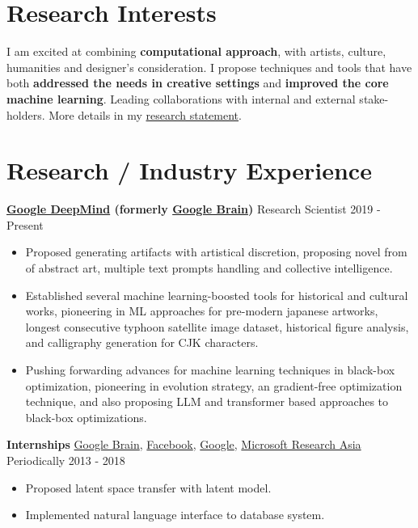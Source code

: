 \documentclass[line,margin]{cv}
\makeatletter
\newcommand{\Google}{\href{https://www.google.com/}{Google}}
\newcommand{\GoogleBrain}{\href{http://research.google.com/teams/brain/}{Google Brain}}
\newcommand{\GoogleDeepMind}{\href{https://www.deepmind.com/}{Google DeepMind}}
\newcommand{\Facebook}{\href{https://www.facebook.com/}{Facebook}}
\newcommand{\MyWebsite}{\href{https://alantian.net}{alantian.net}}
\newcommand{\MyMail}{\href{mailto:alan.yt.tian@gmail.com}{\nolinkurl{alan.yt.tian@gmail.com}}}
\newcommand{\MSRA}{\href{http://research.microsoft.com/en-us/labs/asia/default.aspx}{Microsoft Research Asia}}
\makeatother
\begin{document}

\address{Research Scientist \textbullet{} \GoogleDeepMind{}  / \MyMail{} / \MyWebsite}

\begin{resume}

\section{Research Interests}

  I am excited at combining \textbf{computational approach}, with artists, culture, humanities and designer's consideration.
  I propose techniques and tools that have both \textbf{addressed the needs in creative settings} and \textbf{improved the core machine learning}. 
  Leading collaborations with internal and external stake-holders.
  More details in my \href{https://alantian.net/research_statement.pdf}{research statement}.

\section{Research / Industry Experience}

  {\bf \GoogleDeepMind{} (formerly \GoogleBrain)} {Research Scientist} \hfill 2019 - Present
    \begin{itemize}
      \item Proposed generating artifacts with artistical discretion, 
        proposing novel from of abstract art, multiple text prompts handling and collective intelligence.
      \item Established several machine learning-boosted tools for historical and cultural works, 
        pioneering in ML approaches for pre-modern japanese artworks, longest consecutive typhoon satellite image dataset, historical figure analysis, and calligraphy generation for CJK characters.
      \item Pushing forwarding advances for machine learning techniques in black-box optimization,
        pioneering in evolution strategy, an gradient-free optimization technique,
        and also proposing LLM and transformer based approaches to black-box optimizations.
    \end{itemize}

  {\bf Internships} \GoogleBrain{},  \Facebook{}, \Google{}, \MSRA{} \hfill Periodically 2013 - 2018
    \begin{itemize}
      \item Proposed latent space transfer with latent model.
      \item Implemented natural language interface to database system.
    \end{itemize}



\end{resume}
\end{document}
